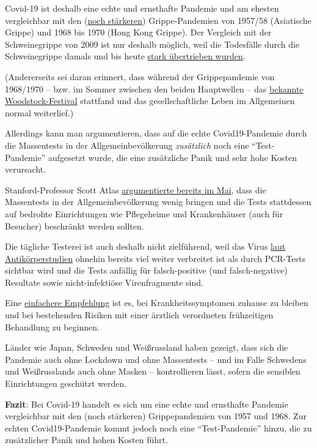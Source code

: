 Covid-19 ist deshalb eine echte und ernsthafte Pandemie und am ehesten
vergleichbar mit den
(\href{https://swprs.files.wordpress.com/2020/06/covid-19-comparison-e1592927192181.png}{noch
stärkeren}) Grippe-Pandemien von 1957/58 (Asiatische Grippe) und 1968
bis 1970 (Hong Kong Grippe). Der Vergleich mit der Schweinegrippe von
2009 ist nur deshalb möglich, weil die Todesfälle durch die
Schweinegrippe damals und bis heute
\href{https://www.cbsnews.com/news/swine-flu-cases-overestimated/}{stark
übertrieben wurden}.

(Andererseits sei daran erinnert, dass während der Grippepandemie von
1968/1970 -- bzw. im Sommer zwischen den beiden Hauptwellen -- das
\href{https://nypost.com/2020/05/16/why-life-went-on-as-normal-during-the-killer-pandemic-of-1969/}{bekannte
Woodstock-Festival} stattfand und das gesellschaftliche Leben im
Allgemeinen normal weiterlief.)

Allerdings kann man argumentieren, dass auf die echte Covid19-Pandemie
durch die Massentests in der Allgemeinbevölkerung \emph{zusätzlich} noch
eine ``Test-Pandemie'' aufgesetzt wurde, die eine zusätzliche Panik und
sehr hohe Kosten verursacht.

Stanford-Professor Scott Atlas
\href{https://www.facebook.com/cnn/posts/10160799274796509}{argumentierte
bereits im Mai}, dass die Massentests in der Allgemeinbevölkerung wenig
bringen und die Tests stattdessen auf bedrohte Einrichtungen wie
Pflegeheime und Krankenhäuser (auch für Besucher) beschränkt werden
sollten.

Die tägliche Testerei ist auch deshalb nicht zielführend, weil das Virus
\href{https://swprs.org/studies-on-covid-19-lethality/}{laut
Antikörperstudien} ohnehin bereits viel weiter verbreitet ist als durch
PCR-Tests sichtbar wird und die Tests anfällig für falsch-positive (und
falsch-negative) Resultate sowie nicht-infektiöse Virenfragmente sind.

Eine
\href{https://infekt.ch/2020/04/corona-testen-testen-und-kein-ende/}{einfachere
Empfehlung} ist es, bei Krankheitssymptomen zuhause zu bleiben und bei
bestehenden Risiken mit einer ärztlich verordneten frühzeitigen
Behandlung zu beginnen.

Länder wie Japan, Schweden und Weißrussland haben gezeigt, dass sich die
Pandemie auch ohne Lockdown und ohne Massentests -- und im Falle
Schwedens und Weißrusslands auch ohne Masken -- kontrollieren lässt,
sofern die sensiblen Einrichtungen geschützt werden.

\textbf{Fazit}: Bei Covid-19 handelt es sich um eine echte und
ernsthafte Pandemie vergleichbar mit den (noch stärkeren)
Grippepandemien von 1957 und 1968. Zur echten Covid19-Pandemie kommt
jedoch noch eine ``Test-Pandemie'' hinzu, die zu zusätzlicher Panik und
hohen Kosten führt.

